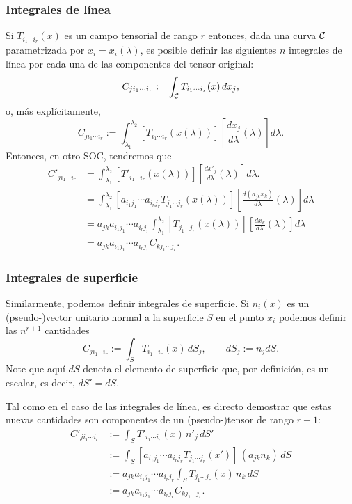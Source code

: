 \subsubsection{Integrales de línea}
Si $T_{i_1\cdots i_r}(x)$ es un campo tensorial de rango $r$ entonces, dada una curva $\cal C$ parametrizada por $x_i=x_i(\lambda)$, es posible definir las siguientes $n$ integrales de línea por cada una de las componentes del tensor original:
\begin{equation}
C_{ji_1\cdots i_r}:=\int_{\cal C}T_{i_1\cdots i_r}(x)\,dx_j,
\end{equation}
o, más explícitamente,
\begin{equation}
C_{ji_1\cdots i_r}:=\int_{\lambda_1}^{\lambda_2}\left[T_{i_1\cdots i_r}(x(\lambda))\right]\left[\frac{dx_j}{d\lambda}(\lambda)\right]d\lambda.
\end{equation}
Entonces, en otro SOC, tendremos que
\begin{align}
C'_{ji_1\cdots i_r} &=\int_{\lambda_1}^{\lambda_2}\left[T'_{i_1\cdots i_r}(x(\lambda))\right]\left[\frac{dx'_j}{d\lambda}(\lambda)\right]d\lambda.\\
&=\int_{\lambda_1}^{\lambda_2}\left[a_{i_1j_1}\cdots a_{i_rj_r}T_{j_1\cdots j_r}(x(\lambda))\right]\left[\frac{d(a_{jk}x_k)}{d\lambda}(\lambda)\right]d\lambda \\
&=a_{jk}a_{i_1j_1}\cdots a_{i_rj_r} \int_{\lambda_1}^{\lambda_2}\left[T_{j_1\cdots j_r}(x(\lambda))\right]\left[\frac{dx_k}{d\lambda}(\lambda)\right]d\lambda \\
&=a_{jk}a_{i_1j_1}\cdots a_{i_rj_r} C_{kj_1\cdots j_r}.
\end{align}

\subsubsection{Integrales de superficie}
Similarmente, podemos definir integrales de superficie. Si $n_i(x)$ es un (pseudo-)vector unitario normal a la superficie $S$ en el punto $x_i$ podemos definir las $n^{r+1}$ cantidades
\begin{equation}
C_{ji_1\cdots i_r}:=\int_S T_{i_1\cdots i_r}(x)\,dS_j, \qquad dS_j:=n_j dS.
\end{equation}
Note que aquí $dS$ denota el elemento de superficie que, por definición, es un escalar, es decir, $dS'=dS$. 

Tal como en el caso de las integrales de línea, es directo demostrar que estas nuevas cantidades son componentes de un (pseudo-)tensor de rango $r+1$:
\begin{align}
C'_{ji_1\cdots i_r} &:= \int_S T'_{i_1\cdots i_r}(x)\,n'_j\,dS' \\
&:= \int_S \left[a_{i_1j_1}\cdots a_{i_rj_r}T_{j_1\cdots j_r}(x')\right]\,(a_{jk}n_k)\, dS \\
&:= a_{jk}a_{i_1j_1}\cdots a_{i_rj_r}\int_S T_{j_1\cdots j_r}(x)\,n_k\, dS \\
&:= a_{jk}a_{i_1j_1}\cdots a_{i_rj_r}C_{kj_1\cdots j_r}  .
\end{align}

